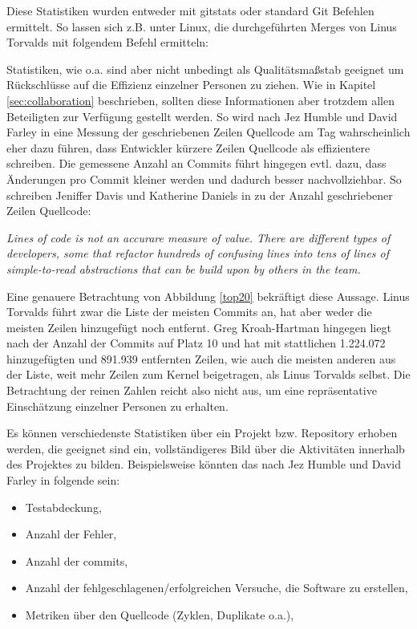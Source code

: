 Diese Statistiken wurden entweder mit gitstats\cite{link:gitstats} oder standard
Git Befehlen ermittelt. So lassen sich z.B. unter Linux, die durchgeführten
Merges von Linus Torvalds mit folgendem Befehl ermitteln:



Statistiken, wie o.a. sind aber nicht unbedingt als Qualitätsmaßstab geeignet um
Rückschlüsse auf die Effizienz einzelner Personen zu ziehen. Wie in Kapitel
\ref{sec:collaboration} beschrieben, sollten diese Informationen aber trotzdem
allen Beteiligten zur Verfügung gestellt werden.  So wird nach Jez Humble und
David Farley in \cite[S.~138]{cd} eine Messung der geschriebenen Zeilen
Quellcode am Tag wahrscheinlich eher dazu führen, dass Entwickler kürzere Zeilen
Quellcode als effizientere schreiben. Die gemessene Anzahl an Commits führt hingegen
evtl. dazu, dass Änderungen pro Commit kleiner werden und dadurch besser
nachvollziehbar. So schreiben Jeniffer Davis und Katherine Daniels in
\cite[S.~179]{effdo} zu der Anzahl geschriebener Zeilen Quellcode:
\begin{center}
\textit{\glqq{}Lines of code is not an accurare measure of value. There are
different types of developers, some that refactor hundreds of confusing lines
into tens of lines of simple-to-read abstractions that can be build upon by
others in the team.\grqq{}}
\end{center}

Eine genauere Betrachtung von Abbildung \ref{top20} bekräftigt diese Aussage.
Linus Torvalds führt zwar die Liste der meisten Commits an, hat aber weder die
meisten Zeilen hinzugefügt noch entfernt. Greg Kroah-Hartman hingegen liegt
nach der Anzahl der Commits auf Platz 10 und hat mit stattlichen 1.224.072
hinzugefügten und 891.939 entfernten Zeilen, wie auch die meisten anderen aus
der Liste, weit mehr Zeilen zum Kernel beigetragen, als Linus Torvalds selbst.
Die Betrachtung der reinen Zahlen reicht also nicht aus, um eine repräsentative
Einschätzung einzelner Personen zu erhalten.

Es können verschiedenste Statistiken über ein Projekt bzw. Repository erhoben
werden, die geeignet sind ein, vollständigeres Bild über die Aktivitäten
innerhalb des Projektes zu bilden. Beispielsweise könnten das nach Jez Humble
und David Farley in \cite[S.~138]{cd}folgende sein:

\begin{itemize}
\item Testabdeckung,
\item Anzahl der Fehler,
\item Anzahl der \glspl{commit},
\item Anzahl der fehlgeschlagenen/erfolgreichen Versuche, die Software zu erstellen,
\item Metriken über den Quellcode (Zyklen, Duplikate o.a.),
\end{itemize}
